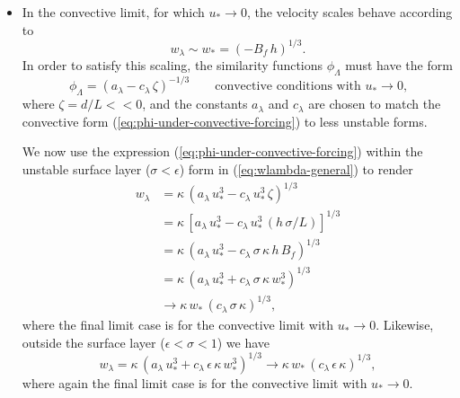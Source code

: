 \begin{itemize}
\begin{itemize}
 \item In the convective limit, for which $u_{*} \rightarrow 0$, the
   velocity scales behave according to 
\begin{equation}
 w_{\lambda} \sim w_{*} = (-B_{f} \, h)^{1/3}.
\label{eq:turbulent-w-in-convective-limit}
 \end{equation}
In order to satisfy this scaling, the similarity functions
$\phi_{\Lambda}$ must have the form 
\begin{equation}
  \phi_{\Lambda} = (a_{\lambda} - c_{\lambda} \, \zeta)^{-1/3}  \qquad \mbox{convective conditions with $u_{*} \rightarrow 0$,}
\label{eq:phi-under-convective-forcing}
\end{equation}
where $\zeta = d/L << 0$, and the constants $a_{\lambda}$ and
$c_{\lambda}$ are chosen to match the convective form
(\ref{eq:phi-under-convective-forcing}) to less unstable forms.  

We now use the expression (\ref{eq:phi-under-convective-forcing})
within the unstable surface layer ($\sigma < \epsilon$) form in
(\ref{eq:wlambda-general}) to render
\begin{subequations}
\begin{align}
w_{\lambda} &= \kappa \, (a_{\lambda} \, u_{*}^{3} - c_{\lambda} \, u_{*}^{3} \, \zeta)^{1/3}
 \\
 &= \kappa \, [a_{\lambda} \, u_{*}^{3} - c_{\lambda} \, u_{*}^{3} \, (h\, \sigma/L) ]^{1/3}
 \\
 &= \kappa \, (a_{\lambda} \, u_{*}^{3} - c_{\lambda} \, \sigma \, \kappa \, h \, B_{f} )^{1/3}
\\
&= \kappa \, (a_{\lambda} \, u_{*}^{3} + c_{\lambda} \, \sigma \, \kappa \, w_{*}^{3} )^{1/3}
\\
 &\rightarrow 
  \kappa \, w_{*} \, (c_{\lambda} \, \sigma \, \kappa)^{1/3},
\end{align}
\end{subequations}
where the final limit case is for the convective limit with $u_{*}
\rightarrow 0$.  Likewise, outside the surface layer ($\epsilon <
\sigma < 1$) we have
\begin{equation}
w_{\lambda} = \kappa \, (a_{\lambda} \, u_{*}^{3} + c_{\lambda} \, \epsilon \, \kappa \, w_{*}^{3} )^{1/3}
  \rightarrow 
  \kappa \, w_{*} \, (c_{\lambda} \, \epsilon \, \kappa)^{1/3},
\label{eq:wlambda-in-convective-limit}
\end{equation}
where again the final limit case is for the convective limit with
$u_{*} \rightarrow 0$.  

\end{itemize}

\end{itemize}


